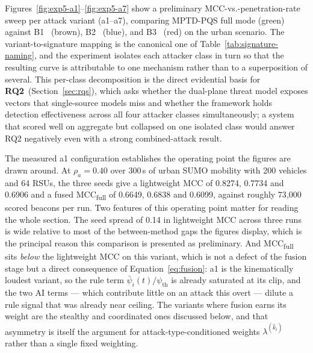 \documentclass[12pt, a4paper]{report}
\begin{document}
Figures~\ref{fig:exp5-a1}--\ref{fig:exp5-a7} show a preliminary
MCC-vs.-penetration-rate sweep per attack variant (a1--a7), comparing
MPTD-PQS full mode (green) against B1~\cite{ghaleb2014} (brown),
B2~\cite{ercan2022misbehavior} (blue), and B3~\cite{sharma2021machine}
(red) on the urban scenario. The variant-to-signature mapping is the
canonical one of Table~\ref{tab:signature-naming}, and the experiment
isolates each attacker class in turn so that the resulting curve is
attributable to one mechanism rather than to a superposition of several.
This per-class decomposition is the direct evidential basis for
\textbf{RQ2}~(Section~\ref{sec:rqs}), which asks whether the dual-plane
threat model exposes vectors that single-source models miss and whether
the framework holds detection effectiveness across all four attacker
classes simultaneously; a system that scored well on aggregate but
collapsed on one isolated class would answer RQ2 negatively even with a
strong combined-attack result.


The measured a1 configuration establishes the operating point the
figures are drawn around. At $\rho_a = 0.40$ over 300\,s of urban SUMO
mobility with 200 vehicles and 64 RSUs, the three seeds give a
lightweight MCC of 0.8274, 0.7734 and 0.6906 and a fused
MCC\textsubscript{full} of 0.6649, 0.6838 and 0.6099, against roughly
73{,}000 scored beacons per run. Two features of this operating point
matter for reading the whole section. The seed spread of 0.14 in
lightweight MCC across three runs is wide relative to most of the
between-method gaps the figures display, which is the principal reason
this comparison is presented as preliminary. And MCC\textsubscript{full}
sits \emph{below} the lightweight MCC on this variant, which is not a
defect of the fusion stage but a direct consequence of
Equation~\ref{eq:fusion}: a1 is the kinematically loudest variant, so
the rule term $\bar{\psi}_i(t)/\psi_{\mathrm{th}}$ is already saturated
at its clip, and the two AI terms --- which contribute little on an
attack this overt --- dilute a rule signal that was already near
ceiling. The variants where fusion earns its weight are the stealthy and
coordinated ones discussed below, and that asymmetry is itself the
argument for attack-type-conditioned weights $\lambda^{(\hat{k}_i)}$
rather than a single fixed weighting.
\end{document}
